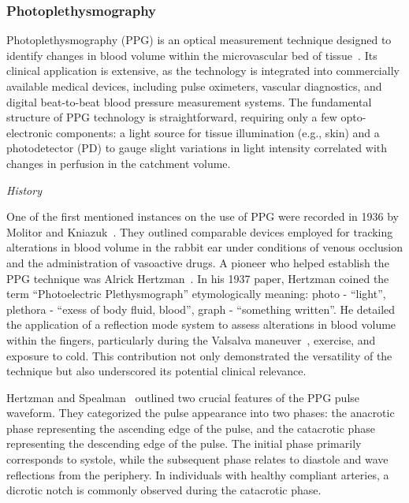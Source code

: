 \subsubsection{Photoplethysmography}
\label{subsubsec:ppg}

Photoplethysmography (PPG) is an optical measurement technique designed to identify changes in blood volume within the microvascular bed of tissue~\cite{challonerPhotoelectricPlethysmographMeasurement1974}.
Its clinical application is extensive, as the technology is integrated into commercially available medical devices, including pulse oximeters, vascular diagnostics, and digital beat-to-beat blood pressure measurement systems.
The fundamental structure of PPG technology is straightforward, requiring only a few opto-electronic components: a light source for tissue illumination (e.g., skin) and a photodetector (PD) to gauge slight variations in light intensity correlated with changes in perfusion in the catchment volume.

\vspace{0.2cm}
\textit{History}
\vspace{0.2cm}

One of the first mentioned instances on the use of PPG were recorded in 1936 by Molitor and Kniazuk~\cite{molitorNewBloodlessMethod1936}.
They outlined comparable devices employed for tracking alterations in blood volume in the rabbit ear under conditions of venous occlusion and the administration of vasoactive drugs.
A pioneer who helped establish the PPG technique was Alrick Hertzman~\cite{hertzmanPhotoelectricPlethysmographyFingers1937}.
In his 1937 paper, Hertzman coined the term \enquote{Photoelectric Plethysmograph} etymologically meaning:
photo - \enquote{light}, plethora - \enquote{exess of body fluid, blood}, graph - \enquote{something written}.
He detailed the application of a reflection mode system to assess alterations in blood volume within the fingers, particularly during the Valsalva maneuver~\cite{srivastavValsalvaManeuver2024}, exercise, and exposure to cold.
This contribution not only demonstrated the versatility of the technique but also underscored its potential clinical relevance.

Hertzman and Spealman~\cite{hertzmanPhotoelectricPlethysmographyFingers1937} outlined two crucial features of the PPG pulse waveform.
They categorized the pulse appearance into two phases: the anacrotic phase representing the ascending edge of the pulse, and the catacrotic phase representing the descending edge of the pulse.
The initial phase primarily corresponds to systole, while the subsequent phase relates to diastole and wave reflections from the periphery.
In individuals with healthy compliant arteries, a dicrotic notch is commonly observed during the catacrotic phase.

